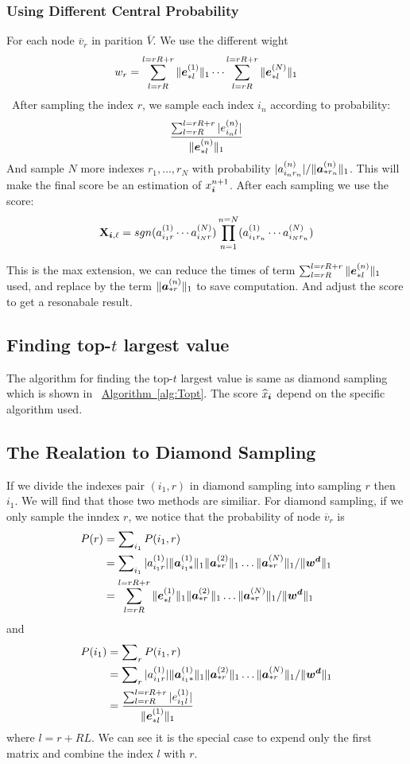 \documentclass[letterpaper]{article}
\newcommand{\Sca}[3]{{#1}^{(#2)}_{i_#2#3}}%
\newcommand{\V}[1]{{\bm{{\MakeLowercase{#1}}}}}
\newcommand{\VnC}[3]{\V{#1}^{(#2)}_{#3}}
\newcommand{\Nrocl}[2]{\norm{\VnC{a}{#1}{*#2}}{1}}
\newcommand{\Varow}[1]{\V{a}^{(#1)}_{i_#1*}}
\newcommand{\Vacol}[1]{\V{a}^{(#1)}_{*r}}
\newcommand{\M}[1]{{\bm{\mathbf{\MakeUppercase{#1}}}}}
\newcommand{\norm}[2]{\|#1\|_{#2}}
\newcommand{\Alg}[1] {\hyperref[alg:#1] {Algorithm~\ref*{alg:#1}}}
\begin{document}
\subsubsection{Using Different Central Probability}
For each node $\overline{v}_r$ in parition $\overline{V}$. We use the different wight
\[
w_r = \sum_{l=rR}^{l=rR+r}\norm{\VnC{e}{1}{*l}}{1}
\cdots\sum_{l=rR}^{l=rR+r}\norm{\VnC{e}{N}{*l}}{1}
\]\
After sampling the index $r$, we sample each index $i_n$ according to probability:
\[
\frac{\sum_{l=rR}^{l=rR+r}|e^{(n)}_{i_nl}|}{\norm{\VnC{e}{n}{*l}}{1}}
\]
And sample $N$ more indexes $r_1,\ldots,r_N$ with probability $|\Sca{a}{n}{r_n}|/\norm{\VnC{a}{n}{*r_n}}{1}$.
This will make the final score be an estimation of  $x^{n+1}_{\V{i}}$.
After each sampling we use the score:
\[
\M{X}_{\V{i},\ell} = sgn(\Sca{a}{1}{r}\cdots\Sca{a}{N}{r})\prod_{n=1}^{n=N}(\Sca{a}{1}{r_n}\cdots\Sca{a}{N}{r_n})
\]

This is the max extension, we can reduce the times of term $\sum_{l=rR}^{l=rR+r}\norm{\VnC{e}{n}{*l}}{1}$ used, and replace by the term $\Nrocl{n}{r}$ to save computation. And adjust the score to get a resonabale result.
\subsection{Finding top-$t$ largest value}

The algorithm for finding the top-$t$ largest value is same as diamond sampling which is shown in ~\Alg{Topt}. The score $\widehat{x}_\V{i}$ depend on the specific algorithm used.

\subsection{The Realation to Diamond Sampling}
If we divide the indexes pair $(i_1,r)$ in diamond sampling into sampling $r$ then $i_1$. We will find that those two methods are similiar. For diamond sampling, if we only sample the inndex $r$, we notice that the probability of node $\overline{v}_r$ is
\begin{align*}
P(r) &= \sum\nolimits_{i_1}P(i_1,r)\\
&= \sum\nolimits_{i_1} 
|\Sca{a}{1}{r}|\norm{\Varow{1}}{1} \norm{\Vacol{2}}{1} \ldots \norm{\Vacol{N}}{1} 
/ \norm{\V{W^d}}{1}\\
& = \sum_{l=rR}^{l=rR+r}\norm{\VnC{e}{1}{*l}}{1}\norm{\Vacol{2}}{1} \ldots \norm{\Vacol{N}}{1} 
/ \norm{\V{W^d}}{1}
\end{align*}
and 
\begin{align*}
P(i_1) &= \sum\nolimits_{r}P(i_1,r)\\
&= \sum\nolimits_{r} 
|\Sca{a}{1}{r}|\norm{\Varow{1}}{1} \norm{\Vacol{2}}{1} \ldots \norm{\Vacol{N}}{1} 
/ \norm{\V{W^d}}{1}\\
& = \frac{\sum_{l=rR}^{l=rR+r}|e^{(1)}_{i_1l}|}{\norm{\VnC{e}{1}{*l}}{1}}
\end{align*}
where $l=r+RL$. We can see it is the special case to expend only the first matrix and combine the index $l$ with $r$.
\end{document}
